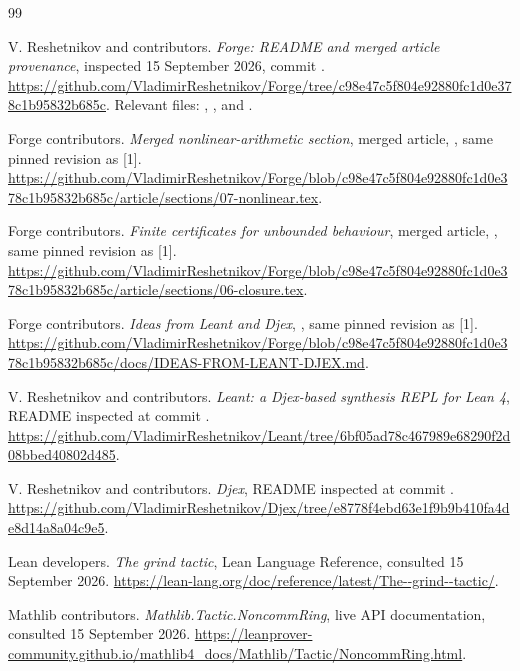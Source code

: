 \begin{thebibliography}{99}
V. Reshetnikov and contributors.
\emph{Forge: README and merged article provenance}, inspected 15 September 2026,
commit .
\url{https://github.com/VladimirReshetnikov/Forge/tree/c98e47c5f804e92880fc1d0e378c1b95832b685c}.
Relevant files: , , and
.

Forge contributors. \emph{Merged nonlinear-arithmetic section}, merged article, ,
same pinned revision as [1].
\url{https://github.com/VladimirReshetnikov/Forge/blob/c98e47c5f804e92880fc1d0e378c1b95832b685c/article/sections/07-nonlinear.tex}.

Forge contributors. \emph{Finite certificates for unbounded behaviour}, merged
article, , same pinned revision as [1].
\url{https://github.com/VladimirReshetnikov/Forge/blob/c98e47c5f804e92880fc1d0e378c1b95832b685c/article/sections/06-closure.tex}.

Forge contributors. \emph{Ideas from Leant and Djex},
, same pinned revision as [1].
\url{https://github.com/VladimirReshetnikov/Forge/blob/c98e47c5f804e92880fc1d0e378c1b95832b685c/docs/IDEAS-FROM-LEANT-DJEX.md}.

V. Reshetnikov and contributors. \emph{Leant: a Djex-based synthesis REPL for
Lean 4}, README inspected at commit
.
\url{https://github.com/VladimirReshetnikov/Leant/tree/6bf05ad78c467989e68290f2d08bbed40802d485}.

V. Reshetnikov and contributors. \emph{Djex}, README inspected at commit
.
\url{https://github.com/VladimirReshetnikov/Djex/tree/e8778f4ebd63e1f9b9b410fa4de8d14a8a04c9e5}.

Lean developers. \emph{The grind tactic}, Lean Language Reference,
consulted 15 September 2026.
\url{https://lean-lang.org/doc/reference/latest/The--grind--tactic/}.

Mathlib contributors. \emph{Mathlib.Tactic.NoncommRing}, live API documentation,
consulted 15 September 2026.
\url{https://leanprover-community.github.io/mathlib4_docs/Mathlib/Tactic/NoncommRing.html}.


\end{thebibliography}
